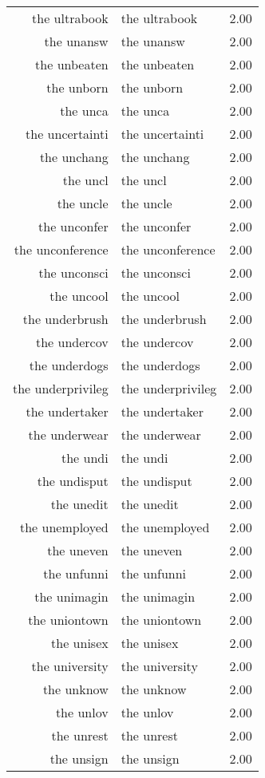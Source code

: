 \begin{table}[ht]
\begin{tabular}{rlr}
  the ultrabook & the ultrabook & 2.00 \\ 
  the unansw & the unansw & 2.00 \\ 
  the unbeaten & the unbeaten & 2.00 \\ 
  the unborn & the unborn & 2.00 \\ 
  the unca & the unca & 2.00 \\ 
  the uncertainti & the uncertainti & 2.00 \\ 
  the unchang & the unchang & 2.00 \\ 
  the uncl & the uncl & 2.00 \\ 
  the uncle & the uncle & 2.00 \\ 
  the unconfer & the unconfer & 2.00 \\ 
  the unconference & the unconference & 2.00 \\ 
  the unconsci & the unconsci & 2.00 \\ 
  the uncool & the uncool & 2.00 \\ 
  the underbrush & the underbrush & 2.00 \\ 
  the undercov & the undercov & 2.00 \\ 
  the underdogs & the underdogs & 2.00 \\ 
  the underprivileg & the underprivileg & 2.00 \\ 
  the undertaker & the undertaker & 2.00 \\ 
  the underwear & the underwear & 2.00 \\ 
  the undi & the undi & 2.00 \\ 
  the undisput & the undisput & 2.00 \\ 
  the unedit & the unedit & 2.00 \\ 
  the unemployed & the unemployed & 2.00 \\ 
  the uneven & the uneven & 2.00 \\ 
  the unfunni & the unfunni & 2.00 \\ 
  the unimagin & the unimagin & 2.00 \\ 
  the uniontown & the uniontown & 2.00 \\ 
  the unisex & the unisex & 2.00 \\ 
  the university & the university & 2.00 \\ 
  the unknow & the unknow & 2.00 \\ 
  the unlov & the unlov & 2.00 \\ 
  the unrest & the unrest & 2.00 \\ 
  the unsign & the unsign & 2.00 \\ 

\end{tabular}
\end{table}
